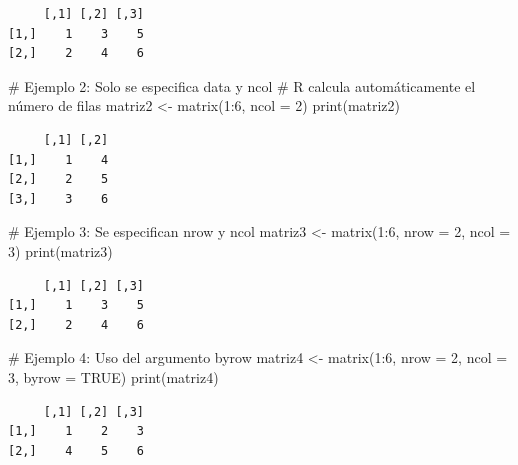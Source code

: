 \documentclass[
  spanish,
  a4paper,
  DIV=11,
  numbers=noendperiod,
  onepage,
  openany]{scrreprt}
\newenvironment{Shaded}{\begin{snugshade}}{\end{snugshade}}
\newcommand{\AttributeTok}[1]{\textcolor[rgb]{0.40,0.45,0.13}{#1}}
\newcommand{\CommentTok}[1]{\textcolor[rgb]{0.37,0.37,0.37}{#1}}
\newcommand{\ConstantTok}[1]{\textcolor[rgb]{0.56,0.35,0.01}{#1}}
\newcommand{\DecValTok}[1]{\textcolor[rgb]{0.68,0.00,0.00}{#1}}
\newcommand{\FunctionTok}[1]{\textcolor[rgb]{0.28,0.35,0.67}{#1}}
\newcommand{\NormalTok}[1]{\textcolor[rgb]{0.00,0.23,0.31}{#1}}
\newcommand{\OtherTok}[1]{\textcolor[rgb]{0.00,0.23,0.31}{#1}}
\newcommand{\SpecialCharTok}[1]{\textcolor[rgb]{0.37,0.37,0.37}{#1}}
\begin{document}
\begin{verbatim}
     [,1] [,2] [,3]
[1,]    1    3    5
[2,]    2    4    6
\end{verbatim}

\begin{Shaded}
\begin{Highlighting}[]
\CommentTok{\# Ejemplo 2: Solo se especifica data y ncol}
\CommentTok{\# R calcula automáticamente el número de filas}
\NormalTok{matriz2 }\OtherTok{\textless{}{-}} \FunctionTok{matrix}\NormalTok{(}\DecValTok{1}\SpecialCharTok{:}\DecValTok{6}\NormalTok{, }\AttributeTok{ncol =} \DecValTok{2}\NormalTok{)}
\FunctionTok{print}\NormalTok{(matriz2)}
\end{Highlighting}
\end{Shaded}

\begin{verbatim}
     [,1] [,2]
[1,]    1    4
[2,]    2    5
[3,]    3    6
\end{verbatim}

\begin{Shaded}
\begin{Highlighting}[]
\CommentTok{\# Ejemplo 3: Se especifican nrow y ncol}
\NormalTok{matriz3 }\OtherTok{\textless{}{-}} \FunctionTok{matrix}\NormalTok{(}\DecValTok{1}\SpecialCharTok{:}\DecValTok{6}\NormalTok{, }\AttributeTok{nrow =} \DecValTok{2}\NormalTok{, }\AttributeTok{ncol =} \DecValTok{3}\NormalTok{)}
\FunctionTok{print}\NormalTok{(matriz3)}
\end{Highlighting}
\end{Shaded}

\begin{verbatim}
     [,1] [,2] [,3]
[1,]    1    3    5
[2,]    2    4    6
\end{verbatim}

\begin{Shaded}
\begin{Highlighting}[]
\CommentTok{\# Ejemplo 4: Uso del argumento byrow}
\NormalTok{matriz4 }\OtherTok{\textless{}{-}} \FunctionTok{matrix}\NormalTok{(}\DecValTok{1}\SpecialCharTok{:}\DecValTok{6}\NormalTok{, }\AttributeTok{nrow =} \DecValTok{2}\NormalTok{, }\AttributeTok{ncol =} \DecValTok{3}\NormalTok{, }\AttributeTok{byrow =} \ConstantTok{TRUE}\NormalTok{)}
\FunctionTok{print}\NormalTok{(matriz4)}
\end{Highlighting}
\end{Shaded}

\begin{verbatim}
     [,1] [,2] [,3]
[1,]    1    2    3
[2,]    4    5    6
\end{verbatim}
\end{document}
